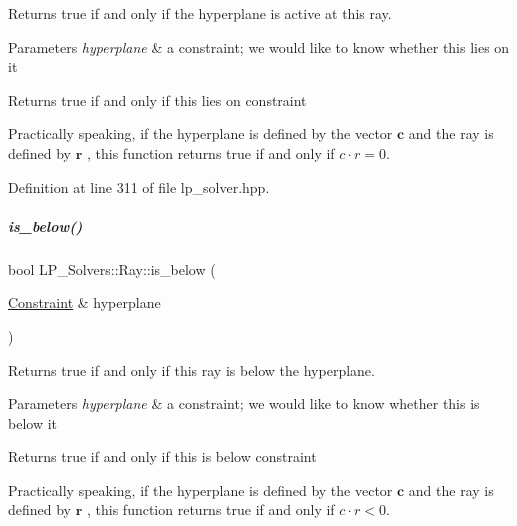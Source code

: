 Returns {\ttfamily true} if and only if the hyperplane is active at this ray. 


\begin{DoxyParams}{Parameters}
{\em hyperplane} & a constraint; we would like to know whether {\ttfamily this} lies on it \\
\hline
\end{DoxyParams}
\begin{DoxyReturn}{Returns}
true if and only if {\ttfamily this} lies on {\ttfamily constraint} 
\end{DoxyReturn}
Practically speaking, if the hyperplane is defined by the vector $ \mathbf c $ and the ray is defined by $ \mathbf r $ , this function returns true if and only if $ c\cdot r = 0 $. 

Definition at line 311 of file lp\+\_\+solver.\+hpp.

\mbox{\label{group___c_l_s_solvers_a4bdad8c5669c06827f3984583e764353}} 
\subparagraph{\texorpdfstring{is\+\_\+below()}{is\_below()}}
{\footnotesize\ttfamily bool L\+P\+\_\+\+Solvers\+::\+Ray\+::is\+\_\+below (\begin{DoxyParamCaption}\item[{\hyperlink{group___c_l_s_solvers_class_l_p___solvers_1_1_constraint}{Constraint} \&}]{hyperplane }\end{DoxyParamCaption})\hspace{0.3cm}{\ttfamily [inline]}}



Returns {\ttfamily true} if and only if this ray is below the hyperplane. 


\begin{DoxyParams}{Parameters}
{\em hyperplane} & a constraint; we would like to know whether {\ttfamily this} is below it \\
\hline
\end{DoxyParams}
\begin{DoxyReturn}{Returns}
true if and only if {\ttfamily this} is below {\ttfamily constraint} 
\end{DoxyReturn}
Practically speaking, if the hyperplane is defined by the vector $ \mathbf c $ and the ray is defined by $ \mathbf r $ , this function returns true if and only if $ c\cdot r < 0 $. 

